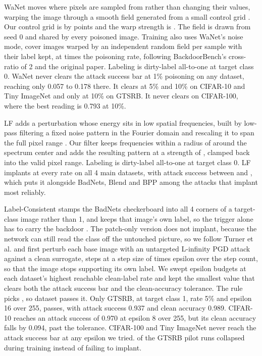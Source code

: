 WaNet moves where pixels are sampled from rather than changing their values, warping the image through a smooth field generated from a small control grid \cite{nguyen2021wanet}. Our control grid is \AttackWanetControlGridSize{} by \AttackWanetControlGridSize{} points and the warp strength is \AttackWanetStrength{}. The field is drawn from seed 0 and shared by every poisoned image. Training also uses WaNet's noise mode, cover images warped by an independent random field per sample with their label kept, at \AttackWanetCoverRatio{} times the poisoning rate, following BackdoorBench's cross-ratio of 2 and the original paper. Labeling is dirty-label all-to-one at target class 0. WaNet never clears the attack success bar at 1\% poisoning on any dataset, reaching only 0.057 to 0.178 there. It clears at 5\% and 10\% on CIFAR-10 and Tiny ImageNet and only at 10\% on GTSRB. It never clears on CIFAR-100, where the best reading is 0.793 at 10\%.

LF adds a perturbation whose energy sits in low spatial frequencies, built by low-pass filtering a fixed noise pattern in the Fourier domain and rescaling it to span the full pixel range \cite{zeng2021lf}. Our filter keeps frequencies within a radius of \AttackLfCutoff{} around the spectrum center and adds the resulting pattern at a strength of \AttackLfStrength{}, clamped back into the valid pixel range. Labeling is dirty-label all-to-one at target class 0. LF implants at every rate on all 4 main datasets, with attack success between \AttackLfAsrMin{} and \AttackLfAsrMax{}, which puts it alongside BadNets, Blend and BPP among the attacks that implant most reliably.

Label-Consistent stamps the BadNets checkerboard into all 4 corners of a target-class image rather than 1, and keeps that image's own label, so the trigger alone has to carry the backdoor \cite{turner2019label}. The patch-only version does not implant, because the network can still read the class off the untouched picture, so we follow Turner et al. and first perturb each base image with an untargeted L-infinity PGD attack against a clean surrogate, \AttackLcPgdSteps{} steps at a step size of \AttackLcPgdStepFactor{} times epsilon over the step count, so that the image stops supporting its own label. We swept \LcEpsilonBudgets{} epsilon budgets at each dataset's highest reachable clean-label rate and kept the smallest value that clears both the attack success bar and the clean-accuracy tolerance. The rule picks \LcEpsilonChosen{}, so \LcDatasetsWithEpsilon{} dataset passes it. Only GTSRB, at target class 1, rate 5\% and epsilon 16 over 255, passes, with attack success 0.937 and clean accuracy 0.989. CIFAR-10 reaches an attack success of 0.970 at epsilon 8 over 255, but its clean accuracy falls by 0.094, past the tolerance. CIFAR-100 and Tiny ImageNet never reach the attack success bar at any epsilon we tried. \LcGtsrbPilotDiverged{} of the \LcGtsrbPilotRuns{} GTSRB pilot runs collapsed during training instead of failing to implant.


